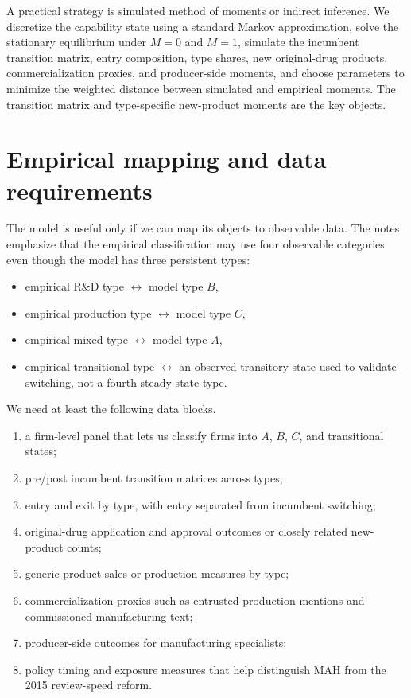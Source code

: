 \documentclass[12pt]{article}
\newcommand{\1}{\mathbf{1}}
\begin{document}
A practical strategy is simulated method of moments or indirect inference. We discretize the capability state using a standard Markov approximation, solve the stationary equilibrium under $M=0$ and $M=1$, simulate the incumbent transition matrix, entry composition, type shares, new original-drug products, commercialization proxies, and producer-side moments, and choose parameters to minimize the weighted distance between simulated and empirical moments. The transition matrix and type-specific new-product moments are the key objects.

\section{Empirical mapping and data requirements}

The model is useful only if we can map its objects to observable data. The notes emphasize that the empirical classification may use four observable categories even though the model has three persistent types:
\begin{itemize}[leftmargin=2em]
    \item empirical R\&D type $\leftrightarrow$ model type $B$,
    \item empirical production type $\leftrightarrow$ model type $C$,
    \item empirical mixed type $\leftrightarrow$ model type $A$,
    \item empirical transitional type $\leftrightarrow$ an observed transitory state used to validate switching, not a fourth steady-state type.
\end{itemize}

We need at least the following data blocks.
\begin{enumerate}[leftmargin=2em]
    \item a firm-level panel that lets us classify firms into $A$, $B$, $C$, and transitional states;
    \item pre/post incumbent transition matrices across types;
    \item entry and exit by type, with entry separated from incumbent switching;
    \item original-drug application and approval outcomes or closely related new-product counts;
    \item generic-product sales or production measures by type;
    \item commercialization proxies such as entrusted-production mentions and commissioned-manufacturing text;
    \item producer-side outcomes for manufacturing specialists;
    \item policy timing and exposure measures that help distinguish MAH from the 2015 review-speed reform.
\end{enumerate}
\end{document}
